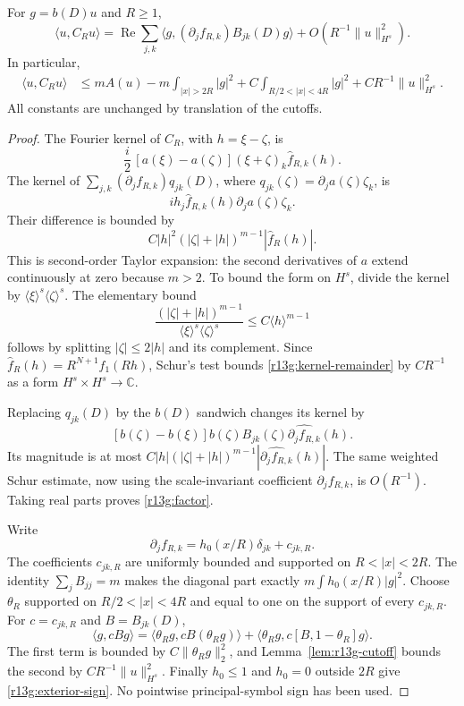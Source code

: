 \begin{lemma}
\label{lem:r13g-principal}
For $g=b(D)u$ and $R\ge1$,
\begin{equation}\label{r13g:factor}
 \langle u,C_Ru\rangle
 =\operatorname{Re}\sum_{j,k}
    \langle g,(\partial_j f_{R,k})B_{jk}(D)g\rangle
       +O(R^{-1}\|u\|_{H^s}^2).
\end{equation}
In particular,
\begin{align}
 \langle u,C_Ru\rangle
 &\le mA(u)-m\int_{|x|>2R}|g|^2
    +C\int_{R/2<|x|<4R}|g|^2
    +CR^{-1}\|u\|_{H^s}^2.
 \label{r13g:exterior-sign}
\end{align}
All constants are unchanged by translation of the cutoffs.
\end{lemma}
\begin{proof}
The Fourier kernel of $C_R$, with $h=\xi-\zeta$, is
\[
 \frac i2\,[a(\xi)-a(\zeta)](\xi+\zeta)_k
                                  \widehat f_{R,k}(h).
\]
The kernel of $\sum_{j,k}(\partial_j f_{R,k})q_{jk}(D)$, where
$q_{jk}(\zeta)=\partial_j a(\zeta)\zeta_k$, is
\[
 i h_j\widehat f_{R,k}(h)\partial_j a(\zeta)\zeta_k.
\]
Their difference is bounded by
\begin{equation}\label{r13g:kernel-remainder}
 C|h|^2(|\zeta|+|h|)^{m-1}|\widehat f_R(h)|.
\end{equation}
This is second-order Taylor expansion: the second derivatives of $a$
extend continuously at zero because $m>2$. To bound the form on $H^s$,
divide the kernel by $\langle\xi\rangle^s\langle\zeta\rangle^s$.
The elementary bound
\[
 \frac{(|\zeta|+|h|)^{m-1}}
      {\langle\xi\rangle^s\langle\zeta\rangle^s}
 \le C\langle h\rangle^{m-1}
\]
follows by splitting $|\zeta|\le2|h|$ and its complement.
Since $\widehat f_R(h)=R^{N+1}\widehat f_1(Rh)$, Schur's test
bounds \eqref{r13g:kernel-remainder} by $CR^{-1}$ as a form
$H^s\times H^s\to\mathbb C$.

Replacing $q_{jk}(D)$ by the $b(D)$ sandwich changes its kernel by
\[
 [b(\zeta)-b(\xi)]b(\zeta)B_{jk}(\zeta)
                      \widehat{\partial_j f_{R,k}}(h).
\]
Its magnitude is at most
$C|h|(|\zeta|+|h|)^{m-1}
|\widehat{\partial_j f_{R,k}}(h)|$.
The same weighted Schur estimate, now using the scale-invariant
coefficient $\partial_j f_{R,k}$, is $O(R^{-1})$.
Taking real parts proves \eqref{r13g:factor}.

Write
\[
 \partial_j f_{R,k}=h_0(x/R)\delta_{jk}+c_{jk,R}.
\]
The coefficients $c_{jk,R}$ are uniformly bounded and supported on
$R<|x|<2R$. The identity $\sum_jB_{jj}=m$ makes the diagonal part
exactly $m\int h_0(x/R)|g|^2$. Choose $\theta_R$ supported on
$R/2<|x|<4R$ and equal to one on the support of every $c_{jk,R}$.
For $c=c_{jk,R}$ and $B=B_{jk}(D)$,
\[
 \langle g,cBg\rangle
 =\langle\theta_Rg,cB(\theta_Rg)\rangle
   +\langle\theta_Rg,c[B,1-\theta_R]g\rangle.
\]
The first term is bounded by $C\|\theta_Rg\|_2^2$, and
Lemma~\ref{lem:r13g-cutoff} bounds the second by
$CR^{-1}\|u\|_{H^s}^2$.
Finally $h_0\le1$ and $h_0=0$ outside $2R$ give
\eqref{r13g:exterior-sign}. No pointwise principal-symbol sign has
been used.
\end{proof}

